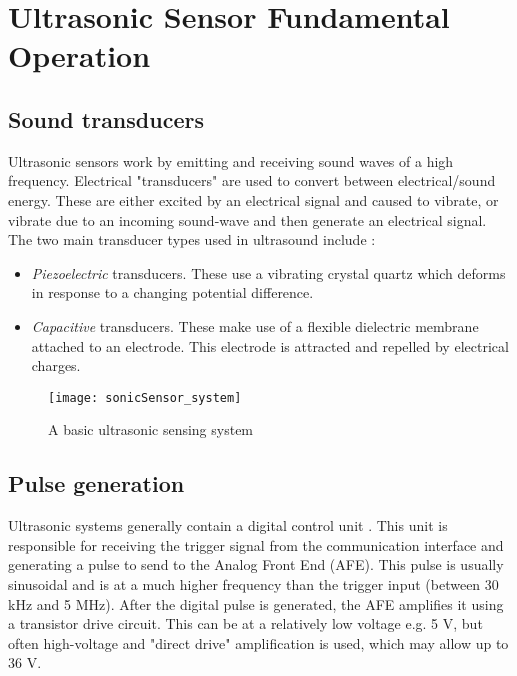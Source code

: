 \graphicspath{{content/1_literatureReview/figures/}}
\section{Ultrasonic Sensor Fundamental Operation}\label{sec:ultrasonicSensorFundamentals}

\subsection{Sound transducers}

Ultrasonic sensors work by emitting and receiving sound waves of a high frequency. Electrical "transducers" are used to convert between electrical/sound energy.
These are either excited by an electrical signal and caused to vibrate, or vibrate due to an incoming sound-wave and then generate an electrical signal.
The two main transducer types used in ultrasound include \cite{ultrasonicSensorWorkings}:
\begin{itemize}
    \item \textit{Piezoelectric} transducers. These use a vibrating crystal quartz which deforms in response to a changing potential difference.
    \item \textit{Capacitive} transducers. These make use of a flexible dielectric membrane attached to an electrode. This electrode is attracted and repelled
          by electrical charges.
\end{itemize}

\begin{figure}[!htb]
    \centering
    \texttt{[image: sonicSensor\_system]}
    \caption{A basic ultrasonic sensing system \cite{ultrasonicSensorBasics}}
    \label{fig:sonicSensor_system}
  \end{figure}

\subsection{Pulse generation}

Ultrasonic systems generally contain a digital control unit \cite{ultrasonicSensorBasics}. This unit is responsible for receiving the trigger signal from the communication interface and generating
a pulse to send to the Analog Front End (AFE). This pulse is usually sinusoidal and is at a much higher frequency than the trigger input (between 30 kHz and 5 MHz).
After the digital pulse is generated, the AFE amplifies it using a transistor drive circuit.
This can be at a relatively low voltage e.g. 5 V, but often high-voltage and "direct drive" amplification is used, which may allow up to 36 V.

